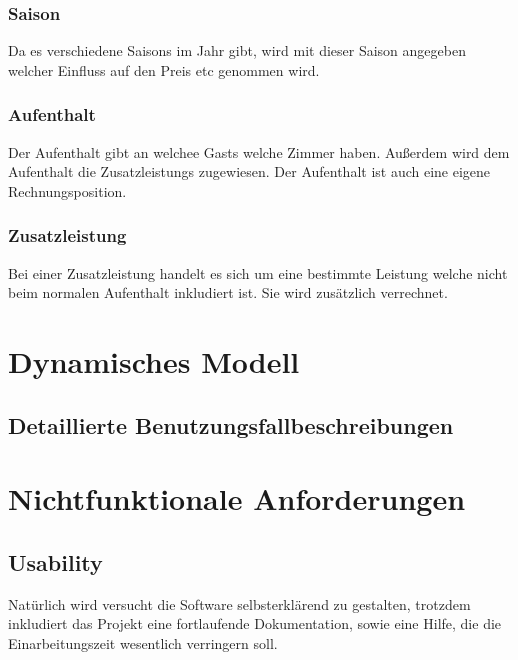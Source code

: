 \documentclass[10pt,a4paper,titlepage]{article}
\begin{document}
\subsubsection{\Gls{Saison}}
Da es verschiedene \Glspl{Saison} im Jahr gibt, wird mit dieser \Gls{Saison} angegeben
welcher Einfluss auf den Preis etc genommen wird. 
\subsubsection{\Gls{Aufenthalt}}
Der \Gls{Aufenthalt} gibt an welchee \Glspl{Gast} welche \Gls{Zimmer} haben.
Außerdem wird dem \Gls{Aufenthalt} die \Glspl{Zusatzleistung} zugewiesen. Der \Gls{Aufenthalt} ist auch eine eigene Rechnungsposition.
\subsubsection{\Gls{Zusatzleistung}}
Bei einer \Gls{Zusatzleistung} handelt es sich um eine bestimmte Leistung welche nicht
beim normalen \Gls{Aufenthalt} inkludiert ist. Sie wird zusätzlich verrechnet.

\newpage

\section{Dynamisches Modell}
\subsection{Detaillierte Benutzungsfallbeschreibungen}















\newpage

\section{Nichtfunktionale Anforderungen}
\subsection{Usability}
Natürlich wird versucht die Software selbsterklärend zu gestalten, trotzdem inkludiert das Projekt eine fortlaufende Dokumentation, sowie eine Hilfe, die die Einarbeitungszeit wesentlich verringern soll.
\end{document}
